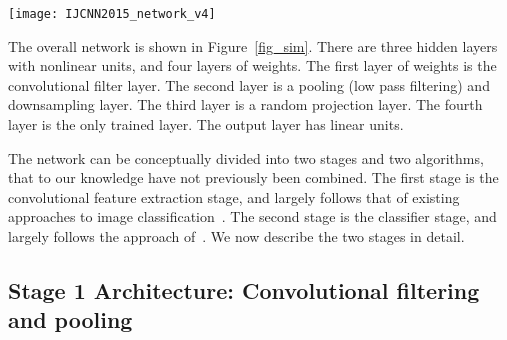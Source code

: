 \documentclass[conference]{IEEEtran}
\begin{document}
\begin{figure*}[!ht]
\centering
\texttt{[image: IJCNN2015\_network\_v4]}
 \caption{Overall network architecture. In total there are three hidden layers, plus an input layer and a linear output layer. There are two main stages: a convolutional filtering and pooling stage, and a classification stage. Only the final layer of weights, ${\bf W}_{\rm out}$ is learnt, and this is achieved in a single batch using least squares regression. Of the remaining weights matrices, ${\bf W}_{\rm Filter}$ is specified and remains fixed, e.g. taken from Overfeat~\cite{Sermanet.14_overfeat}; ${\bf W}_{\rm  Pool}$ describes standard average pooling and downsampling; and ${\bf W}_{\rm in}$ is set randomly or by using the method of~\cite{Zhu.15} that specifies the weights by sampling examples of the training distribution, as described in the text. Other variables shown are as follows: $J^2$ is the number of pixels in an image, $L$ is the number of features extracted per image, $D$ is a downsampling factor,  $M$ is the number of hidden units in the classifier stage and $N$ is the number of classes. }
\label{fig_sim}
\end{figure*}

The overall network is shown in Figure~\ref{fig_sim}. There are three hidden layers  with nonlinear units, and four layers of weights. The first layer of weights is the convolutional filter layer. The second layer is a pooling (low pass filtering) and downsampling layer. The third layer is a random projection layer. The fourth layer is the only trained layer. The output layer has linear units. 



The network can be conceptually divided into two stages and two algorithms, that to our knowledge have not previously been combined. The first stage is the convolutional feature extraction stage, and largely follows that of existing approaches to image classification~\cite{Coates.11,Coates.11a,Le.10,Sermanet.12}. The second stage is the classifier stage, and largely follows the approach of~\cite{Zhu.15,McDonnell.15PLOS}.  We now describe the two stages in detail.







\subsection{Stage 1 Architecture: Convolutional filtering and pooling}\label{S:Stage1}
\end{document}
